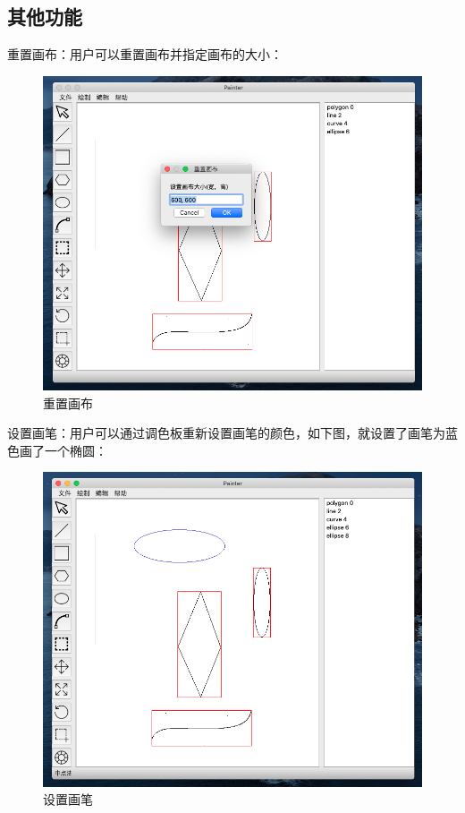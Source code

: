 \documentclass[11pt, a4paper, UTF8]{ctexart}
\begin{document}
\subsection{其他功能}

重置画布：用户可以重置画布并指定画布的大小：

\begin{figure}[H]
    \centering
    \includegraphics[scale=0.5]{reset.png}
    \caption{重置画布}
\end{figure}

设置画笔：用户可以通过调色板重新设置画笔的颜色，如下图，就设置了画笔为蓝色画了一个椭圆：

\begin{figure}[H]
    \centering
    \includegraphics[scale=0.5]{color.png}
    \caption{设置画笔}
\end{figure}
\end{document}
